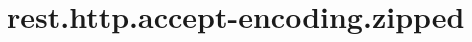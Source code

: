\section{rest.http.accept-encoding.zipped}
\label{configuration:RestHttpAcceptEncodingZipped}
\TODO
